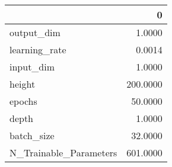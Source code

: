 \begin{tabular}{lr}
\toprule
{} &         0 \\
\midrule
output\_dim             &    1.0000 \\
learning\_rate          &    0.0014 \\
input\_dim              &    1.0000 \\
height                 &  200.0000 \\
epochs                 &   50.0000 \\
depth                  &    1.0000 \\
batch\_size             &   32.0000 \\
N\_Trainable\_Parameters &  601.0000 \\
\bottomrule
\end{tabular}
